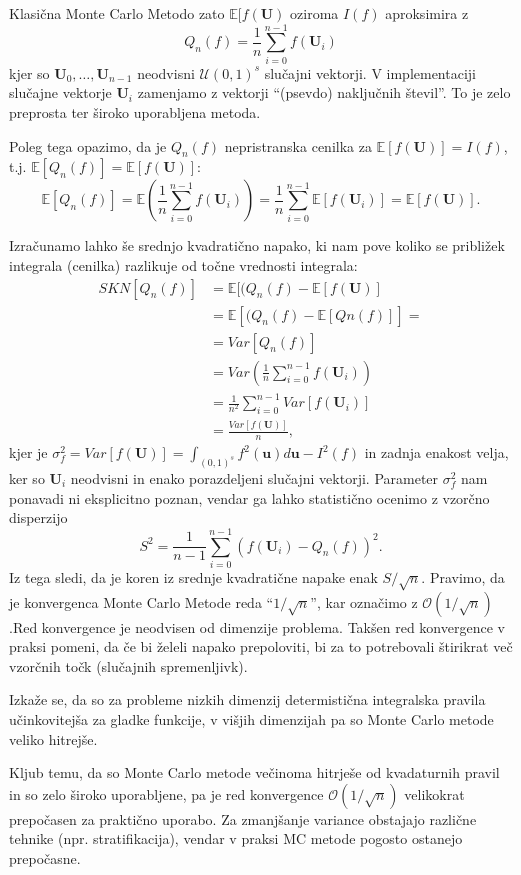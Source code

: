 \documentclass[12pt,a4paper, reqno]{amsart}
\theoremstyle{definition} %
\theoremstyle{plain} %
\newcommand{\E}{\mathbb E}
\newcommand{\U}{\boldsymbol U}
\begin{document}
Klasična Monte Carlo Metodo zato $\E[f(\U)$ oziroma $I(f)$ aproksimira z 
\[Q_n(f) = \frac{1}{n} \sum_{i=0}^{n-1} f(\U_i)
\]
kjer so $\U_0,\ldots,\U_{n-1}$ neodvisni $\mathcal{U}(0,1)^s$ slučajni vektorji.  V implementaciji slučajne vektorje $\U_i$ zamenjamo z vektorji ``(psevdo) naključnih števil''.
To je zelo preprosta ter široko uporabljena metoda.

Poleg tega opazimo, da je $Q_n(f)$  nepristranska cenilka za $\E[f(\U)] = I(f)$, t.j. $\E[Q_n(f)] = \E[f(\U)]$:
\[
\E[Q_n(f)] = \E\left( \frac{1}{n} \sum_{i=0}^{n-1} f(\U_i)\right) = \frac{1}{n}  \sum_{i=0}^{n-1}\E[ f(\U_i)] =\E[f(\U)].
\]
\vspace{2mm}

Izračunamo lahko še srednjo kvadratično napako, ki nam pove koliko se približek integrala (cenilka) razlikuje od točne vrednosti integrala:
\vspace{2mm}
\[
\begin{split}
SKN[Q_n(f)] & = \E[(Q_n(f) - \E[f(\U)] \\
& = \E[(Q_n(f) - \E[Qn(f)]] = \\
& = Var[Q_n(f)] \\
& = Var\left(\frac{1}{n} \sum_{i=0}^{n-1} f(\U_i)\right) \\
& = \frac{1}{n^2}  \sum_{i=0}^{n-1} Var[f(\U_i)]\\
& = \frac{Var[f(\U)]}{n},
\end{split}
\]
kjer je $\sigma^2_f = Var[f(\U)] = \int_{(0,1)^s} f^2(\boldsymbol u) d \boldsymbol u - I^{2}(f)$ in zadnja enakost velja, ker so $\U_i$ neodvisni in enako porazdeljeni slučajni vektorji.
Parameter  $\sigma^2_f$ nam ponavadi ni eksplicitno poznan, vendar ga lahko statistično ocenimo z vzorčno disperzijo 
\[
S^2 = \frac{1}{n-1}\sum_{i=0}^{n-1}(f(\U_i) - Q_n(f))^2.
\]
Iz tega sledi, da je koren iz srednje kvadratične napake enak $S/\sqrt{n}$.
Pravimo, da je konvergenca Monte Carlo Metode reda ``$1/\sqrt{n}$'', kar označimo z $\mathcal {O}(1/\sqrt{n})$.Red konvergence je neodvisen od dimenzije problema. Takšen red konvergence v praksi pomeni, da če bi želeli napako prepoloviti, bi za to potrebovali štirikrat več vzorčnih točk (slučajnih spremenljivk).

Izkaže se, da so za probleme nizkih dimenzij determistična integralska pravila učinkovitejša za gladke funkcije, v višjih dimenzijah pa so Monte Carlo metode veliko hitrejše.

Kljub temu, da so Monte Carlo metode večinoma hitrješe od kvadaturnih pravil in so zelo široko uporabljene, pa je red konvergence  $\mathcal {O}(1/\sqrt{n})$ velikokrat prepočasen za praktično uporabo. Za zmanjšanje variance obstajajo različne tehnike (npr. stratifikacija), vendar v praksi MC metode pogosto ostanejo prepočasne.
\end{document}
